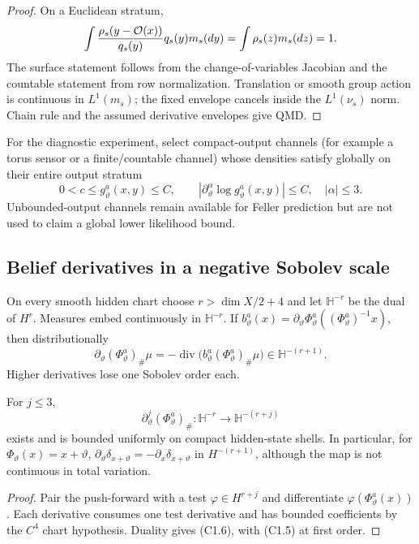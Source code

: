 \begin{proof}
On a Euclidean stratum,
\[
 \int {\rho_s(y-\mathcal O(x))\over q_s(y)}q_s(y)m_s(dy)
 =\int\rho_s(z)m_s(dz)=1.
\]
The surface statement follows from the change-of-variables Jacobian and the
countable statement from row normalization.  Translation or smooth group
action is continuous in $L^1(m_s)$; the fixed envelope cancels inside the
$L^1(\nu_s)$ norm.  Chain rule and the assumed derivative envelopes give QMD.
\end{proof}

For the diagnostic experiment, select compact-output channels (for example a
torus sensor or a finite/countable channel) whose densities satisfy globally
on their entire output stratum
\[
 0<c\le g_\vartheta^a(x,y)\le C,
 \qquad |\partial_\vartheta^\alpha\log g_\vartheta^a(x,y)|\le C,
 \quad |\alpha|\le3.                                     \tag{C1.4}
\]
Unbounded-output channels remain available for Feller prediction but are not
used to claim a global lower likelihood bound.

\subsection{Belief derivatives in a negative Sobolev scale}

On every smooth hidden chart choose $r>\dim X/2+4$ and let
$\mathbb H^{-r}$ be the dual of $H^r$.  Measures embed continuously in
$\mathbb H^{-r}$.  If
$b^a_\vartheta(x)=\partial_\vartheta\Phi^a_\vartheta
 ((\Phi^a_\vartheta)^{-1}x)$, then distributionally
\[
 \partial_\vartheta(\Phi^a_\vartheta)_\#\mu
 =-\operatorname{div}\bigl(b^a_\vartheta
     (\Phi^a_\vartheta)_\#\mu\bigr)\in\mathbb H^{-(r+1)}.               \tag{C1.5}
\]
Higher derivatives lose one Sobolev order each.

\begin{lemma}
\label{lem:r29-c1-push}
For $j\le3$,
\[
 \partial_\vartheta^j(\Phi^a_\vartheta)_\#:
 \mathbb H^{-r}\longrightarrow\mathbb H^{-(r+j)}          \tag{C1.6}
\]
exists and is bounded uniformly on compact hidden-state shells.  In
particular, for $\Phi_\vartheta(x)=x+\vartheta$,
$\partial_\vartheta\delta_{x+\vartheta}= -\partial_x\delta_{x+\vartheta}$
in $H^{-(r+1)}$, although the map is not continuous in total variation.
\end{lemma}

\begin{proof}
Pair the push-forward with a test $\varphi\in H^{r+j}$ and differentiate
$\varphi(\Phi^a_\vartheta(x))$.  Each derivative consumes one test derivative
and has bounded coefficients by the $C^4$ chart hypothesis.  Duality gives
(C1.6), with (C1.5) at first order.
\end{proof}

